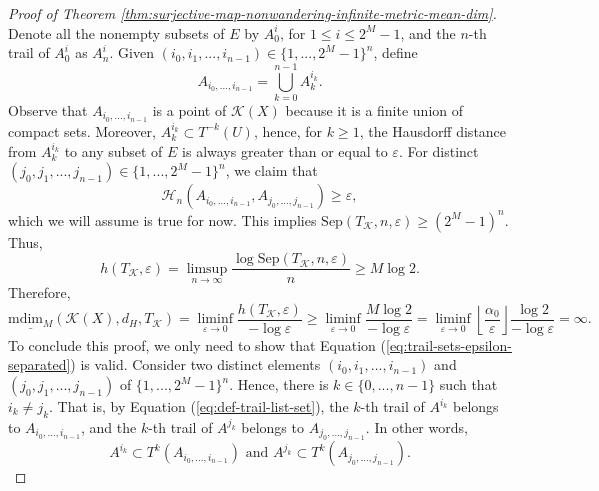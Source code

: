 \documentclass[sn-mathphys-num]{sn-jnl}%
\theoremstyle{thmstyleone}%
\theoremstyle{thmstyletwo}%
\theoremstyle{thmstylethree}%
\newcommand*\induce[1]{#1_\mathcal{K}}
\newcommand*\hyp[1]{\mathcal{#1}}
\begin{document}
\begin{proof}[Proof of Theorem \emph{\ref{thm:surjective-map-nonwandering-infinite-metric-mean-dim}}]
    Denote all the nonempty subsets of $E$ by $A^i_0$, for $1 \leq i \leq 2^M - 1$, and the $n$-th trail of $A^i_0$ as $A^i_n$. Given $(i_0, i_1, ..., i_{n - 1}) \in \{1, ..., 2^M - 1\}^n$, define
    \begin{equation}\label{eq:def-trail-list-set}
        A_{i_0, ..., i_{n - 1}} = \bigcup\limits_{k = 0}^{n - 1} A^{i_k}_k.
    \end{equation}
    Observe that $A_{i_0, ..., i_{n - 1}}$ is a point of $\hyp{K}(X)$ because it is a finite union of compact sets. Moreover, $A^{i_k}_k \subset T^{-k}(U)$, hence, for $k \geq 1$, the Hausdorff distance from $A^{i_k}_k$ to any subset of $E$ is always greater than or equal to $\varepsilon$. For distinct $(j_0, j_1, ..., j_{n - 1}) \in \{1, ..., 2^M - 1\}^n$, we claim that
    \begin{equation}\label{eq:trail-sets-epsilon-separated}
        \mathcal{H}_n(A_{i_0, ..., i_{n - 1}}, A_{j_0, ..., j_{n - 1}}) \geq \varepsilon,
    \end{equation}
    which we will assume is true for now. This implies $\text{Sep}(\induce{T}, n, \varepsilon) \geq (2^M - 1)^n$. Thus,
    \begin{equation*}
        h(\induce{T}, \varepsilon) = \limsup\limits_{n \to \infty} \frac{\log \text{Sep}(\induce{T}, n, \varepsilon)}{n} \geq M\log 2.
    \end{equation*}
    Therefore,
    \begin{equation*}
        \underline{\text{mdim}_M}(\hyp{K}(X), d_H, \induce{T}) = \liminf\limits_{\varepsilon \to 0} \frac{h(\induce{T}, \varepsilon)}{-\log\varepsilon} \geq \liminf\limits_{\varepsilon \to 0}\frac{M\log 2}{-\log \varepsilon} = \liminf\limits_{\varepsilon \to 0} \left\lfloor\frac{\alpha_0}{\varepsilon}\right\rfloor\frac{\log 2}{-\log \varepsilon} = \infty.
    \end{equation*}
    To conclude this proof, we only need to show that Equation (\ref{eq:trail-sets-epsilon-separated}) is valid. Consider two distinct elements $(i_0, i_1, ..., i_{n - 1})$ and $(j_0, j_1, ..., j_{n - 1})$ of $\{1, ..., 2^M - 1\}^n$. Hence, there is $k \in \{0, ..., n - 1\}$ such that $i_k \neq j_k$. That is, by Equation (\ref{eq:def-trail-list-set}), the $k$-th trail of $A^{i_k}$ belongs to $A_{i_0, ..., i_{n - 1}}$, and the $k$-th trail of $A^{j_k}$ belongs to $A_{j_0, ..., j_{n - 1}}$. In other words,
    \begin{equation*}
        A^{i_k} \subset T^k(A_{i_0, ..., i_{n - 1}}) \text{ and } A^{j_k} \subset T^k(A_{j_0, ..., j_{n - 1}}).

\end{equation*}
\end{proof}
\end{document}
